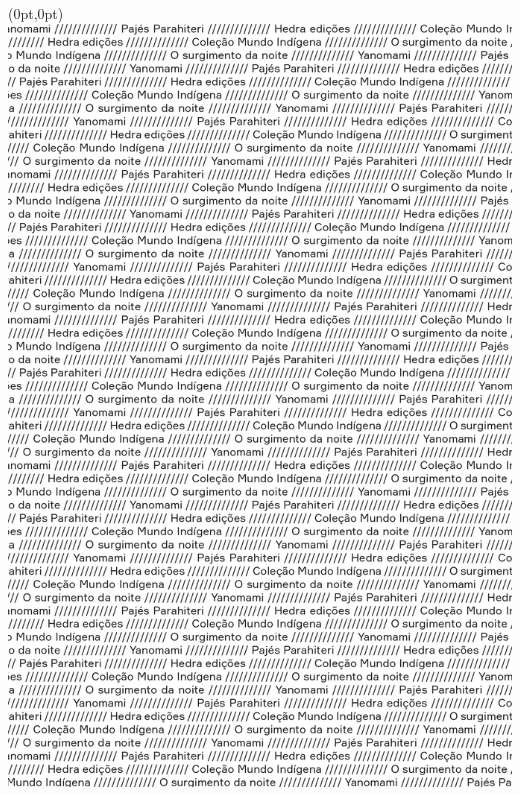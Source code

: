 \thispagestyle{empty}

\begin{textblock*}{-2in}(0pt,0pt)%
\vspace*{-1.8cm}
\hspace*{-3cm}\includegraphics[width=142mm]{./ABERTURA.png}  
\end{textblock*}

\pagebreak
\blankpage




